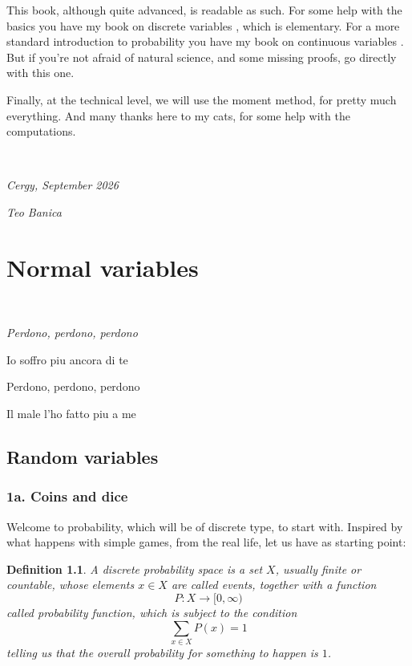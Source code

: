 \documentclass[12pt]{amsbook}
\newtheorem{definition}[theorem]{Definition}
\begin{document}
\bigskip

This book, although quite advanced, is readable as such. For some help with the basics you have my book on discrete variables \cite{ba1}, which is elementary. For a more standard introduction to probability you have my book on continuous variables \cite{ba2}. But if you're not afraid of natural science, and some missing proofs, go directly with this one.

\bigskip

Finally, at the technical level, we will use the moment method, for pretty much everything. And many thanks here to my cats, for some help with the computations.

\bigskip

\

{\em Cergy, September 2026}

\smallskip

{\em Teo Banica}

\baselineskip=15.95pt
\tableofcontents
\baselineskip=14pt

\part{Normal variables}

\ \vskip50mm

\begin{center}
{\em Perdono, perdono, perdono

Io soffro piu ancora di te

Perdono, perdono, perdono

Il male l'ho fatto piu a me}
\end{center}

\chapter{Random variables}

\section*{1a. Coins and dice}

Welcome to probability, which will be of discrete type, to start with. Inspired by what happens with simple games, from the real life, let us have as starting point:

\begin{definition}
A discrete probability space is a set $X$, usually finite or countable, whose elements $x\in X$ are called events, together with a function
$$P:X\to[0,\infty)$$
called probability function, which is subject to the condition
$$\sum_{x\in X}P(x)=1$$
telling us that the overall probability for something to happen is $1$.
\end{definition}
\end{document}
